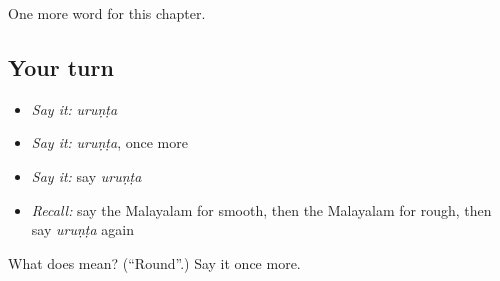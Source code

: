 \begin{grammarlens}[title={What you've built}]
One more word for this chapter.
\end{grammarlens}

\subsection*{Your turn}
\begin{itemize}
\raggedright
  \item \emph{Say it:} \emph{uruṇṭa}
  \item \emph{Say it:} \emph{uruṇṭa}, once more
  \item \emph{Say it:} say \emph{uruṇṭa}
  \item \emph{Recall:} say the Malayalam for smooth, then the Malayalam for rough, then say \emph{uruṇṭa} again
\end{itemize}

\begin{tcolorbox}[breakable,colback=teal!4,colframe=teal!35!black,title={Before you move on}]
What does  mean? (\textquotedblleft{}Round\textquotedblright{}.) Say it once more.
\end{tcolorbox}
